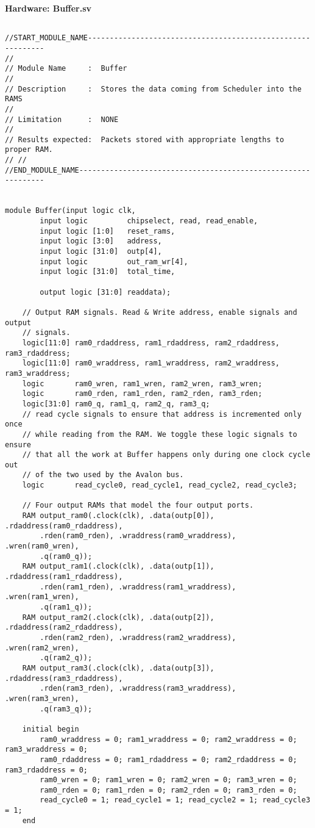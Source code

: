 \documentclass[twoside,12pt,fleqn]{book} %
\begin{document}
\newpage
\textbf{Hardware: Buffer.sv}
\begin{lstlisting}

//START_MODULE_NAME------------------------------------------------------------
//
// Module Name     :  Buffer
//
// Description     :  Stores the data coming from Scheduler into the RAMS
//
// Limitation      :  NONE
// 
// Results expected:  Packets stored with appropriate lengths to proper RAM.
// //
//END_MODULE_NAME--------------------------------------------------------------

        
module Buffer(input logic clk,
        input logic         chipselect, read, read_enable, 
		input logic [1:0]   reset_rams,
        input logic [3:0]   address, 
        input logic [31:0]  outp[4],
        input logic         out_ram_wr[4],
        input logic [31:0]	total_time,

        output logic [31:0] readdata);

    // Output RAM signals. Read & Write address, enable signals and output
    // signals.
    logic[11:0] ram0_rdaddress, ram1_rdaddress, ram2_rdaddress, ram3_rdaddress;
    logic[11:0] ram0_wraddress, ram1_wraddress, ram2_wraddress, ram3_wraddress;
	logic       ram0_wren, ram1_wren, ram2_wren, ram3_wren;
    logic       ram0_rden, ram1_rden, ram2_rden, ram3_rden;
    logic[31:0] ram0_q, ram1_q, ram2_q, ram3_q;
    // read cycle signals to ensure that address is incremented only once
    // while reading from the RAM. We toggle these logic signals to ensure
    // that all the work at Buffer happens only during one clock cycle out 
    // of the two used by the Avalon bus.
    logic       read_cycle0, read_cycle1, read_cycle2, read_cycle3;

    // Four output RAMs that model the four output ports.
    RAM output_ram0(.clock(clk), .data(outp[0]), .rdaddress(ram0_rdaddress),
        .rden(ram0_rden), .wraddress(ram0_wraddress), .wren(ram0_wren),
        .q(ram0_q));
    RAM output_ram1(.clock(clk), .data(outp[1]), .rdaddress(ram1_rdaddress),
        .rden(ram1_rden), .wraddress(ram1_wraddress), .wren(ram1_wren),
        .q(ram1_q));
    RAM output_ram2(.clock(clk), .data(outp[2]), .rdaddress(ram2_rdaddress),
        .rden(ram2_rden), .wraddress(ram2_wraddress), .wren(ram2_wren),
        .q(ram2_q));
    RAM output_ram3(.clock(clk), .data(outp[3]), .rdaddress(ram3_rdaddress),
        .rden(ram3_rden), .wraddress(ram3_wraddress), .wren(ram3_wren),
        .q(ram3_q));

    initial begin
	    ram0_wraddress = 0; ram1_wraddress = 0; ram2_wraddress = 0; ram3_wraddress = 0;
		ram0_rdaddress = 0; ram1_rdaddress = 0; ram2_rdaddress = 0; ram3_rdaddress = 0;
        ram0_wren = 0; ram1_wren = 0; ram2_wren = 0; ram3_wren = 0;
        ram0_rden = 0; ram1_rden = 0; ram2_rden = 0; ram3_rden = 0;
        read_cycle0 = 1; read_cycle1 = 1; read_cycle2 = 1; read_cycle3 = 1;
    end


\end{lstlisting}
\end{document}
